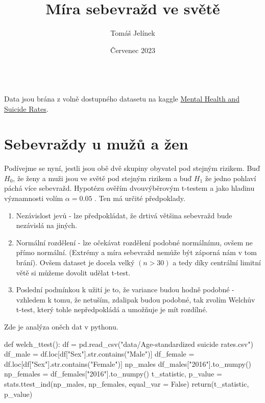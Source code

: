 \documentclass[12pt]{article}
\title{Míra sebevražd ve světě}
\author{Tomáš Jelínek}
\date{Červenec 2023}
\begin{document}
\maketitle
{}\\

Data jsou brána z volně dostupného datasetu na kaggle \href{https://www.kaggle.com/datasets/twinkle0705/mental-health-and-suicide-rates?select=Facilities.csv}{Mental Health and Suicide Rates}.  

\section{Sebevraždy u mužů a žen}
Podívejme se nyní, jestli jsou obě dvě skupiny obyvatel pod stejným rizikem. Buď $H_0$, že ženy a muži jsou ve světě pod stejným rizikem a buď $H_1$ že jedno pohlaví páchá více sebevražd. Hypotézu ověřím dvouvýběrovým t-testem a jako hladinu významnosti volím $\alpha = 0.05$ . Ten má určité předpoklady.
\begin{enumerate}
\item Nezávislost jevů - lze předpokládat, že drtivá většina sebevražd bude nezávislá na jiných.
\item Normální rozdělení - lze očekávat rozdělení podobné normálnímu, ovšem ne přímo normální. (Extrémy a míra sebevražd nemůže být záporná nám v tom brání). Ovšem dataset je docela velký $(n > 30)$ a tedy díky centrální limitní větě si můžeme dovolit udělat t-test.
\item Poslední podmínkou k užití je to, že variance budou hodně podobné - vzhledem k tomu, že netuším, zdalipak budou podobné, tak zvolím Welchův t-test, který tohle nepředpokládá a umožňuje je mít rozdílné.
\end{enumerate}

\newpage
Zde je analýza oněch dat v pythonu.
\begin{python}
def welch_ttest():
	df = pd.read_csv("data/Age-standardized suicide rates.csv")
    df_male = df.loc[df["Sex"].str.contains("Male")]
    df_female = df.loc[df["Sex"].str.contains("Female")]
    np_males df_males["2016"].to_numpy()
    np_females = df_females["2016"].to_numpy()
    t_statistic, p_value = stats.ttest_ind(np_males, np_females, equal_var = False)
    return(t_statistic, p_value)
\end{python}
\end{document}
